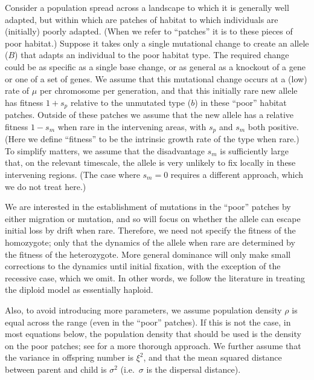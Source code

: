 \documentclass{article}
\newcommand{\citep}[1]{\cite{#1}}
\newcommand{\citet}[1]{\cite{#1}}
\newcommand{\gc}[1]{{\it\color{green}(#1)} }
\newcommand{\plr}[1]{{\it\color{blue}(#1)}}
\begin{document}
Consider a population spread across a landscape to which it is generally well adapted,
but within which are patches of habitat to which individuals are (initially) poorly adapted.
(When we refer to ``patches'' it is to these pieces of poor habitat.)
Suppose it takes only a single mutational change to create an allele
($B$) that adapts an individual to the poor habitat type.
The required change could be as specific as a single base change, 
or as general as a knockout of a gene or one of a set of genes.
We assume that this mutational change occurs at a (low) rate of $\mu$ per chromosome per generation,
and that this initially rare new allele has fitness $1+s_p$ relative to the unmutated type ($b$) in these ``poor'' habitat patches.
Outside of these patches we assume that the new allele has a relative fitness
$1-s_m$  when rare in the intervening areas, with $s_p$ and $s_m$ both positive.
(Here we define ``fitness'' to be the intrinsic growth rate of the type when rare.)
To simplify matters, we assume that the disadvantage $s_m$ 
is sufficiently large that, on the relevant timescale,
the allele is very unlikely to fix locally in these intervening regions.
(The case where $s_m=0$ requires a different approach, which we do not treat here.)

We are interested in the establishment of mutations in the ``poor'' patches by either
migration or mutation, and so will focus on whether the allele
can escape initial loss by drift when rare. 
Therefore, we need not specify the fitness of the homozygote; 
only that the dynamics of the allele when rare 
are determined by the fitness of the heterozygote. 
More general dominance will only make small corrections to the dynamics until initial fixation,
with the exception of the recessive case, which we omit.
In other words,
we follow the literature in treating the diploid model as essentially haploid.

Also, to avoid introducing more parameters,
we assume population density $\rho$ is equal across the range (even in the ``poor'' patches).
If this is not the case, in most equations below, the population density that should be used is the density
on the poor patches; see \citet{lenormand2002limits} for a more thorough approach.
We further assume that the variance in offspring number is $\xi^2$, 
and that the mean squared distance between parent and child is $\sigma^2$
(i.e.\ $\sigma$ is the dispersal distance). 
\end{document}
